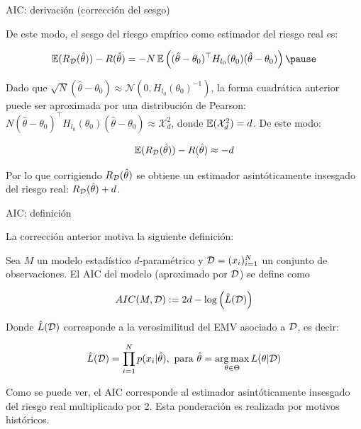 \documentclass[9pt]{beamer}
\begin{document}
\begin{frame}{AIC: derivación (corrección del sesgo)}


De este modo, el sesgo del riesgo empírico como estimador del riesgo real es:

\begin{equation*}
	\E(R_\datos(\hat{\theta})) - R(\hat{\theta}) = -N \E\left((\hat{\theta}-\theta_0)^\top H_{l_0}(\theta_0) (\hat{\theta}-\theta_0)\right)\pause
\end{equation*}

Dado que $\sqrt{N}\left(\hat{\theta}-\theta_0\right)\approx\mathcal{N}\left(0,H_{l_0}(\theta_0)^{-1}\right)$, la forma cuadrática anterior puede ser aproximada por una distribución de Pearson: $N(\hat{\theta}-\theta_0)^\top H_{l_0}(\theta_0) (\hat{\theta}-\theta_0)\approx\mathcal{X}^2_d$, donde $\operatorname{\mathbb{E}}(\mathcal{X}^2_d)=d$. De este modo:

\begin{equation*}
	\operatorname{\mathbb{E}}(R_{\mathcal D}(\hat{\theta})) - R(\hat{\theta}) \approx -d
\end{equation*}\pause

Por lo que corrigiendo $R_{\mathcal D}(\hat{\theta})$ se obtiene un estimador asintóticamente insesgado del riesgo real: $R_{\mathcal D}(\hat{\theta})+d$.

\end{frame}

\begin{frame}{AIC: definición}

La corrección anterior motiva la siguiente definición:

\begin{definition}[AIC]
	Sea $M$ un modelo estadístico $d$-paramétrico y ${\mathcal D}=(x_i)_{i=1}^N$ un conjunto de observaciones. El AIC del modelo (aproximado por ${\mathcal D}$) se define como
	
	\begin{equation*}
		AIC(M,{\mathcal D}):=2d-\log\left(\hat{L}({\mathcal D})\right)
	\end{equation*}
	
	Donde $\hat{L}({\mathcal D})$ corresponde a la verosimilitud del EMV asociado a ${\mathcal D}$, es decir:
	
	\begin{equation*}
		\hat{L}({\mathcal D}) = \prod_{i=1}^N p(x_i|\hat{\theta}),\text{ para } \hat{\theta} = \operatorname*{arg\,max}_{\theta\in\Theta} L(\theta|{\mathcal D})
	\end{equation*}
\end{definition}\pause

Como se puede ver, el AIC corresponde al estimador asintóticamente insesgado del riesgo real multiplicado por 2. Esta ponderación es realizada por motivos históricos.
	
\end{frame}
\end{document}
